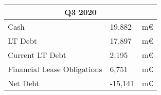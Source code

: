 \documentclass{company_analysis}
\begin{document}
\newpage
{}

\begin{tabular}{ |p{5cm}||p{3cm}|p{}|  }
    \hline
    \multicolumn{3}{|c|}{\raggedleft Q3 2020} \\
    \hline
    Cash   & 19,882    &m€\\
    \hline
    LT Debt& 17,897  & m€\\
    Current LT Debt & 2,195 & m€\\
    Financial Lease Obligations &6,751 & m€\\
    \hline
    Net Debt & -15,141 &m€\\
    \hline
   \end{tabular}
\end{document}
